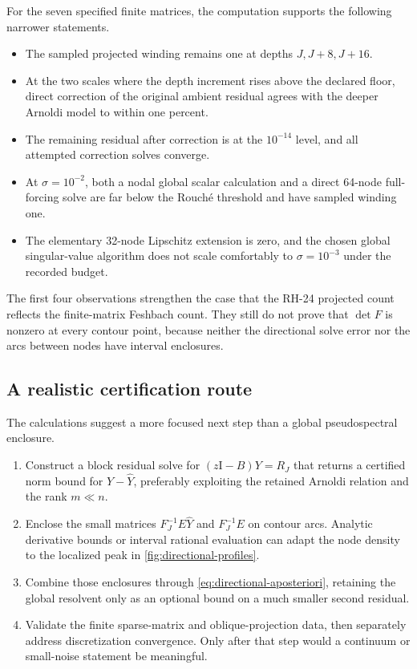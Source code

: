 \documentclass[11pt]{article}
\theoremstyle{definition}
\theoremstyle{remark}
\newcommand{\Id}{\mathrm I}
\begin{document}
For the seven specified finite matrices, the computation supports the
following narrower statements.

\begin{itemize}
 \item The sampled projected winding remains one at depths \(J,J+8,J+16\).
 \item At the two scales where the depth increment rises above the declared
 floor, direct correction of the original ambient residual agrees with the
 deeper Arnoldi model to within one percent.
 \item The remaining residual after correction is at the \(10^{-14}\)
 level, and all attempted correction solves converge.
 \item At \(\sigma=10^{-2}\), both a nodal global scalar calculation and a
 direct 64-node full-forcing solve are far below the Rouch\'e threshold and
 have sampled winding one.
 \item The elementary 32-node Lipschitz extension is zero, and the chosen
 global singular-value algorithm does not scale comfortably to
 \(\sigma=10^{-3}\) under the recorded budget.
\end{itemize}

The first four observations strengthen the case that the RH-24 projected
count reflects the finite-matrix Feshbach count.  They still do not prove
that \(\det F\) is nonzero at every contour point, because neither the
directional solve error nor the arcs between nodes have interval
enclosures.

\subsection{A realistic certification route}

The calculations suggest a more focused next step than a global
pseudospectral enclosure.

\begin{enumerate}
 \item Construct a block residual solve for
 \((z\Id-B)Y=R_J\) that returns a certified norm bound for
 \(Y-\widehat Y\), preferably exploiting the retained Arnoldi relation and
 the rank \(m\ll n\).
 \item Enclose the small matrices \(F_J^{-1}E\widehat Y\) and
 \(F_J^{-1}E\) on contour arcs.  Analytic derivative bounds or interval
 rational evaluation can adapt the node density to the localized peak in
 \cref{fig:directional-profiles}.
 \item Combine those enclosures through
 \cref{eq:directional-aposteriori}, retaining the global resolvent only as
 an optional bound on a much smaller second residual.
 \item Validate the finite sparse-matrix and oblique-projection data, then
 separately address discretization convergence.  Only after that step
 would a continuum or small-noise statement be meaningful.
\end{enumerate}
\end{document}
